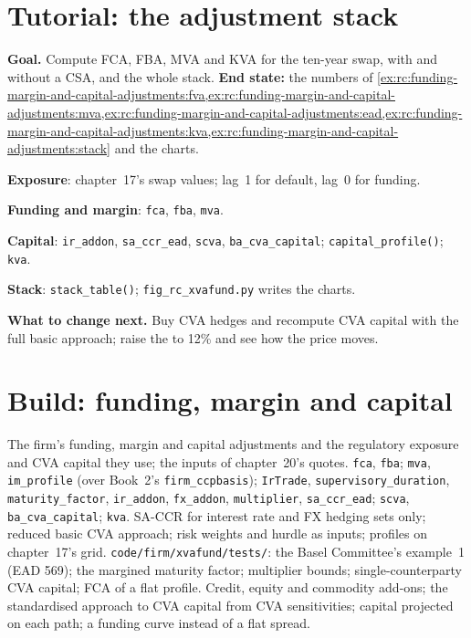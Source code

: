 \section{Tutorial: the adjustment stack}\label{tut:rc:funding-margin-and-capital-adjustments:tutorial}

\begin{tutorial}
\textbf{Goal.} Compute FCA, FBA, MVA and KVA for the ten-year swap, with and without a CSA, and
the whole stack. \textbf{End state:} the numbers of
\cref{ex:rc:funding-margin-and-capital-adjustments:fva,ex:rc:funding-margin-and-capital-adjustments:mva,ex:rc:funding-margin-and-capital-adjustments:ead,ex:rc:funding-margin-and-capital-adjustments:kva,ex:rc:funding-margin-and-capital-adjustments:stack}
and the charts.
\begin{tutsteps}
\item \textbf{Exposure}: chapter~17's swap values; lag~1 for default, lag~0 for funding.
\item \textbf{Funding and margin}: \texttt{fca}, \texttt{fba}, \texttt{mva}.
\item \textbf{Capital}: \texttt{ir\_addon}, \texttt{sa\_ccr\_ead}, \texttt{scva},
\texttt{ba\_cva\_capital}; \texttt{capital\_profile()}; \texttt{kva}.
\item \textbf{Stack}: \texttt{stack\_table()}; \texttt{fig\_rc\_xvafund.py} writes the charts.
\end{tutsteps}
\textbf{What to change next.} Buy CVA hedges and recompute CVA capital with the full basic
approach; raise the  to 12\% and see how the price moves.
\end{tutorial}

\section{Build: funding, margin and capital}\label{bld:rc:funding-margin-and-capital-adjustments:xvafund}

\begin{build}
 The firm's funding, margin and capital adjustments and the regulatory
exposure and CVA capital they use; the inputs of chapter~20's quotes.
 \texttt{fca}, \texttt{fba}; \texttt{mva}, \texttt{im\_profile} (over Book~2's
\texttt{firm\_ccpbasis}); \texttt{IrTrade}, \texttt{supervisory\_duration},
\texttt{maturity\_factor}, \texttt{ir\_addon}, \texttt{fx\_addon}, \texttt{multiplier},
\texttt{sa\_ccr\_ead}; \texttt{scva}, \texttt{ba\_cva\_capital}; \texttt{kva}.
 SA-CCR for interest rate and FX hedging sets only; reduced basic CVA approach;
risk weights and hurdle as inputs; profiles on chapter~17's grid.
 \texttt{code/firm/xvafund/tests/}: the Basel Committee's example~1
(EAD 569); the margined maturity factor; multiplier bounds; single-counterparty CVA capital;
FCA of a flat profile.
 Credit, equity and commodity add-ons; the standardised approach to CVA
capital from CVA sensitivities; capital projected on each path; a funding curve instead of
a flat spread.
\end{build}

